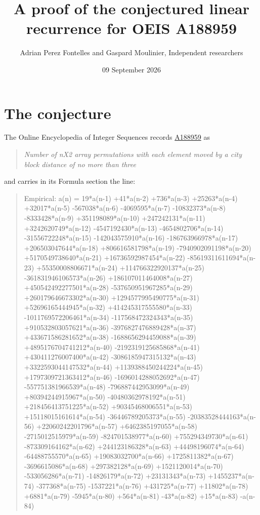 \documentclass[11pt]{article}
\title{A proof of the conjectured linear recurrence for OEIS A188959}
\author{Adrian Perez Fontelles and Gaspard Moulinier, Independent researchers}
\date{09 September 2026}
\theoremstyle{definition}
\begin{document}
\maketitle
\section{The conjecture}

The Online Encyclopedia of Integer Sequences records \href{https://oeis.org/A188959}{A188959} as

\begin{quote}\itshape Number of nX2 array permutations with each element moved by a city block distance of no more than three\end{quote}

and carries in its Formula section the line:

\begin{quote}\ttfamily Empirical: a(n) = 19*a(n-1) +41*a(n-2) +736*a(n-3) +25263*a(n-4) +32017*a(n-5) -567038*a(n-6) -4069595*a(n-7) -10832373*a(n-8) -8333428*a(n-9) +351198089*a(n-10) +247242131*a(n-11) +3242620749*a(n-12) -4547192430*a(n-13) -4654802706*a(n-14) -31556722248*a(n-15) -142043575910*a(n-16) -186763966978*a(n-17) +206503047644*a(n-18) +806616581798*a(n-19) -7940902091198*a(n-20) +5170549738640*a(n-21) +16736592987454*a(n-22) -85619311611694*a(n-23) +55350008806671*a(n-24) +114766322920137*a(n-25) -361831946106573*a(n-26) +186107011464008*a(n-27) +450542492277501*a(n-28) -537650951967285*a(n-29) +260179646673302*a(n-30) +1294577995490775*a(n-31) +52696165444945*a(n-32) +414245317555580*a(n-33) -1011769572206461*a(n-34) -117568472324343*a(n-35) +910532803057621*a(n-36) -3976827476889428*a(n-37) +433671586281652*a(n-38) -1688656294459088*a(n-39) +4895176704741212*a(n-40) -2192319125685868*a(n-41) +430411276007400*a(n-42) -3086185947315132*a(n-43) +3322593044147532*a(n-44) +1139388450244224*a(n-45) +1797309721363412*a(n-46) -1696014288052692*a(n-47) -557751381966539*a(n-48) -796887442953099*a(n-49) +80394244915967*a(n-50) -40480362978192*a(n-51) +218456413751225*a(n-52) +90345468006551*a(n-53) +15118015161614*a(n-54) -36446789205373*a(n-55) -20383528444163*a(n-56) +22060242201796*a(n-57) +6462385197055*a(n-58) -2715012515979*a(n-59) -824701538977*a(n-60) +755294349730*a(n-61) -873309164162*a(n-62) +244123186328*a(n-63) +44498196074*a(n-64) -64488755570*a(n-65) +19083032700*a(n-66) +1725811382*a(n-67) -3696615086*a(n-68) +297382128*a(n-69) +1521120014*a(n-70) -533056286*a(n-71) -14826179*a(n-72) +23131343*a(n-73) +1455237*a(n-74) -377368*a(n-75) -1537221*a(n-76) +431725*a(n-77) +11802*a(n-78) +6881*a(n-79) -5945*a(n-80) +564*a(n-81) -43*a(n-82) +15*a(n-83) -a(n-84)\end{quote}
\end{document}
